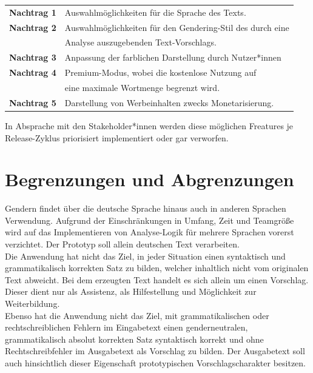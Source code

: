 \documentclass[paper=a4, parskip=half]{scrreprt}
\begin{document}
\begin{table}[!htb]
\begin{tabular}{ll}
\textbf{Nachtrag 1} & Auswahlmöglichkeiten für die Sprache des Texts. \vspace{0.1cm} \\
\textbf{Nachtrag 2} & Auswahlmöglichkeiten für den Gendering-Stil des durch eine \\
 & Analyse auszugebenden Text-Vorschlags. \vspace{0.1cm} \\
\textbf{Nachtrag 3} & Anpassung der farblichen Darstellung durch Nutzer*innen \vspace{0.1cm} \\
\textbf{Nachtrag 4} & Premium-Modus, wobei die kostenlose Nutzung auf \\
& eine maximale Wortmenge begrenzt wird. \vspace{0.1cm} \\
\textbf{Nachtrag 5} & Darstellung von Werbeinhalten zwecks Monetarisierung. \vspace{0.1cm} \\
\end{tabular}
\end{table}

In Absprache mit den Stakeholder*innen werden diese möglichen Freatures je Release-Zyklus priorisiert implementiert oder gar verworfen.

\section{Begrenzungen und Abgrenzungen}
Gendern findet über die deutsche Sprache hinaus auch in anderen Sprachen Verwendung. Aufgrund der Einschränkungen in Umfang, Zeit und Teamgröße wird auf das Implementieren von Analyse-Logik für mehrere Sprachen vorerst verzichtet. Der Prototyp soll allein deutschen Text verarbeiten.\\
Die Anwendung hat nicht das Ziel, in jeder Situation einen syntaktisch und grammatikalisch korrekten Satz zu bilden, welcher inhaltlich nicht vom originalen Text abweicht. Bei dem erzeugten Text handelt es sich allein um einen Vorschlag. Dieser dient nur als Assistenz, als Hilfestellung und Möglichkeit zur Weiterbildung.\\
Ebenso hat die Anwendung nicht das Ziel, mit grammatikalischen oder rechtschreiblichen Fehlern im Eingabetext einen genderneutralen, grammatikalisch absolut korrekten Satz syntaktisch korrekt und ohne Rechtschreibfehler im Ausgabetext als Vorschlag zu bilden. Der Ausgabetext soll auch hinsichtlich dieser Eigenschaft prototypischen Vorschlagscharakter besitzen.
\end{document}
